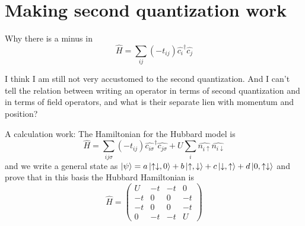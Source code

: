 \section{Making second quantization work}
Why there is a minus in
$$
\hat{H}=\sum_{ij}(-t_{ij})\hat{c_i}^{\dagger}\hat{c_j}
$$

I think I am still not very accustomed to the second quantization. And I can't tell the relation between writing an operator in terms of second quantization and in terms of field operators, and what is their separate lien with momentum and position?

A calculation work: The Hamiltonian for the Hubbard model is
$$
\hat{H}=\sum_{ij\sigma}(-t_{ij})\hat{c_{i\sigma}}^{\dagger}\hat{c_{j\sigma}}+U\sum_i\hat{n_{i\uparrow}}\hat{n_{i\downarrow}}
$$
and we write a general state as $\left\lvert \psi\right\rangle=a\left\lvert \uparrow\downarrow,0\right\rangle+b\left\lvert \uparrow,\downarrow\right\rangle+c\left\lvert \downarrow,\uparrow\right\rangle+d\left\lvert 0,\uparrow\downarrow\right\rangle$ and prove that in this basis the Hubbard Hamiltonian is
$$
\hat{H}=\begin{pmatrix}
U&-t&-t&0\\
-t&0&0&-t\\
-t&0&0&-t\\
0&-t&-t&U
\end{pmatrix}
$$

